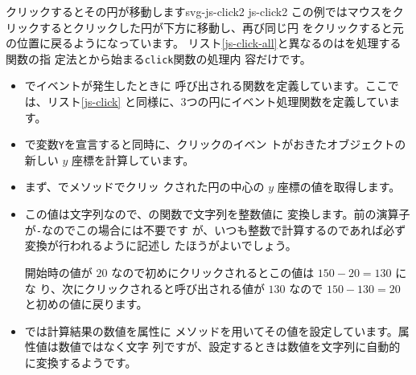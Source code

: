 {クリックするとその円が移動します}{svg-js-click2}
\newpage
{}
{js-click2}
この例ではマウスをクリックするとクリックした円が下方に移動し、再び同じ円
をクリックすると元の位置に戻るようになっています。
リスト\ref{js-click-all}と異なるのはを処理する関数の指
定法とから始まる\texttt{click}関数の処理内
容だけです。
\begin{itemize}
 \item {}でイベントが発生したときに
       呼び出される関数を定義しています。ここでは、リスト\ref{js-click}
       と同様に、3つの円にイベント処理関数を定義しています。
 \item {}で変数\texttt{Y}を宣言すると同時に、クリックのイベン
       トがおきたオブジェクトの新しい $y$ 座標を計算しています。
 \item まず、でメソッドでクリッ
       クされた円の中心の $y$ 座標の値を取得します。
 \item この値は文字列なので、\JS の関数で文字列を整数値に
       変換します。前の演算子が\texttt{-}なのでこの場合には不要です
       が、いつも整数で計算するのであれば必ず変換が行われるように記述し
       たほうがよいでしょう。

開始時の値が $20$ なので初めにクリックされるとこの値は $150-20=130$ にな
       り、次にクリックされると呼び出される値が $130$ なので
       $150-130=20$ と初めの値に戻ります。
 \item {}では計算結果の数値を属性に
       メソッドを用いてその値を設定しています。属性値は数値ではなく文字
       列ですが、設定するときは数値を文字列に自動的に変換するようです。
\end{itemize}

